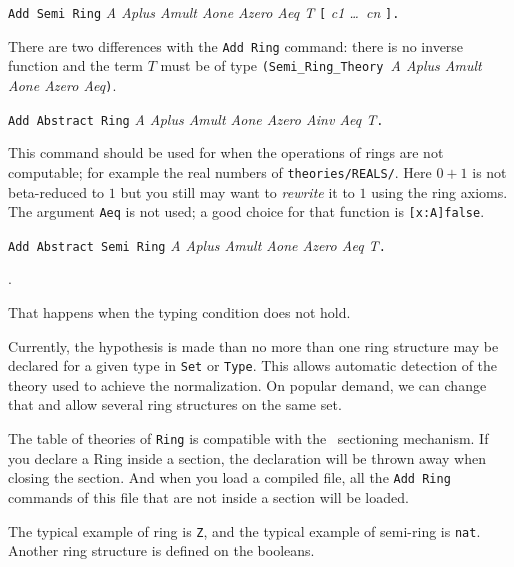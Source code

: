 \begin{Variants}
\item \texttt{Add Semi Ring} \textit{A Aplus Amult Aone Azero Aeq T} 
  \texttt{[} \textit{c1 \dots\ cn} \texttt{].}
  
  There are two differences with the \texttt{Add Ring} command: there
  is no inverse function and the term $T$ must be of type
  \texttt{(Semi\_Ring\_Theory }\textit{A Aplus Amult Aone Azero
    Aeq}\texttt{)}.

\item \texttt{Add Abstract Ring} \textit{A Aplus Amult Aone Azero Ainv 
    Aeq T}\texttt{.}
  
  This command should be used for when the operations of rings are not
  computable; for example the real numbers of
  \texttt{theories/REALS/}. Here $0+1$ is not beta-reduced to $1$ but
  you still may want to \textit{rewrite} it to $1$ using the ring
  axioms. The argument \texttt{Aeq} is not used; a good choice for
  that function is \verb+[x:A]false+.

\item \texttt{Add Abstract Semi Ring} \textit{A Aplus Amult Aone Azero
    Aeq T}\texttt{.}

\end{Variants}

\begin{ErrMsgs}
\item {}.
 
  That happens when the typing condition does not hold.
\end{ErrMsgs}

Currently, the hypothesis is made than no more than one ring structure
may be declared for a given type in \texttt{Set} or \texttt{Type}.
This allows automatic detection of the theory used to achieve the
normalization. On popular demand, we can change that and allow several
ring structures on the same set.

The table of theories of \texttt{Ring} is compatible with the \Coq\ 
sectioning mechanism. If you declare a Ring inside a section, the
declaration will be thrown away when closing the section.
And when you load a compiled file, all the \texttt{Add Ring}
commands of this file that are not inside a section will be loaded.

The typical example of ring is \texttt{Z}, and the typical example of
semi-ring is \texttt{nat}. Another ring structure is defined on the
booleans. 

